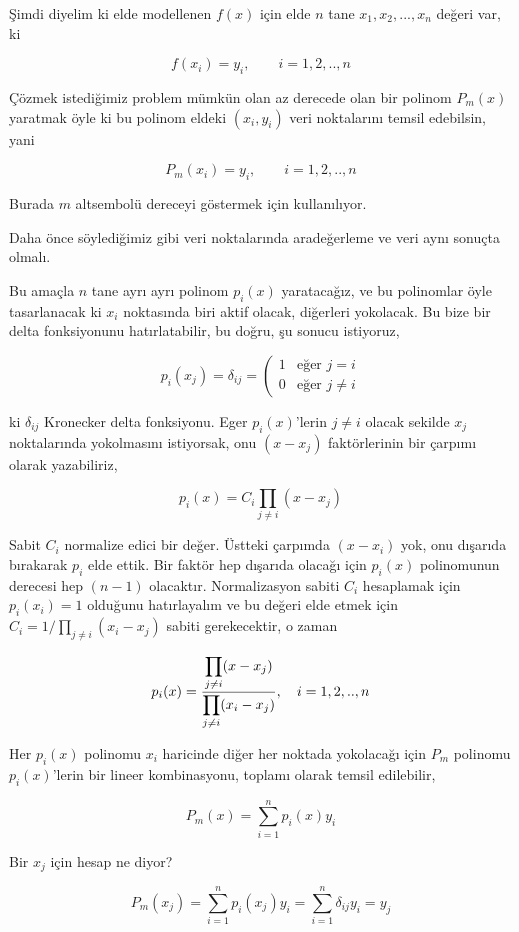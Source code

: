 \documentclass[12pt,fleqn]{article}\usepackage{../../common}
\begin{document}
Şimdi diyelim ki elde modellenen $f(x)$ için elde $n$ tane $x_1,x_2,...,x_n$
değeri var, ki

$$
f(x_i) = y_i, \qquad i=1,2,..,n
$$

Çözmek istediğimiz problem mümkün olan az derecede olan bir polinom $P_m(x)$
yaratmak öyle ki bu polinom eldeki $(x_i,y_i)$ veri noktalarını temsil
edebilsin, yani

$$
P_m(x_i) = y_i, \qquad i=1,2,..,n
$$

Burada $m$ altsembolü dereceyi göstermek için kullanılıyor.

Daha önce söylediğimiz gibi veri noktalarında aradeğerleme ve veri aynı sonuçta
olmalı.

Bu amaçla $n$ tane ayrı ayrı polinom $p_i(x)$ yaratacağız, ve bu polinomlar öyle
tasarlanacak ki $x_i$ noktasında biri aktif olacak, diğerleri yokolacak.  Bu
bize bir delta fonksiyonunu hatırlatabilir, bu doğru, şu sonucu istiyoruz,

$$
p_i(x_j) = \delta_{ij} = \left(
\begin{array}{ll}
1 & \textrm{eğer } j = i  \\
0 & \textrm{eğer } j \ne i 
\end{array} \right.
$$


ki $\delta_{ij}$ Kronecker delta fonksiyonu. Eger $p_i(x)$'lerin $j \ne i$
olacak sekilde $x_j$ noktalarında yokolmasını istiyorsak, onu $(x-x_j)$
faktörlerinin bir çarpımı olarak yazabiliriz,

$$
p_i(x) = C_i \prod_{j \ne i} (x-x_j)
$$

Sabit $C_i$ normalize edici bir değer. Üstteki çarpımda $(x-x_i)$ yok,
onu dışarıda bırakarak $p_i$ elde ettik. Bir faktör hep dışarıda olacağı
için $p_i(x)$ polinomunun derecesi hep $(n-1)$ olacaktır. Normalizasyon
sabiti $C_i$ hesaplamak için $p_i(x_i)=1$ olduğunu hatırlayalım ve
bu değeri elde etmek için $C_i = 1 / \prod_{j \ne i} (x_i - x_j)$
sabiti gerekecektir, o zaman

$$
p_i(x) = \frac
{\displaystyle \prod_{j \ne i} (x - x_j)}
{\displaystyle \prod_{j \ne i} (x_i - x_j)},
\quad i=1,2,..,n
$$

Her $p_i(x)$ polinomu $x_i$ haricinde diğer her noktada yokolacağı için $P_m$
polinomu $p_i(x)$'lerin bir lineer kombinasyonu, toplamı olarak temsil
edilebilir,

$$
P_m(x) =  \sum_{i=1}^{n} p_i (x) y_i
$$

Bir $x_j$ için hesap ne diyor?

$$
P_m(x_j) = \sum_{i=1}^{n} p_i(x_j) y_i =  \sum_{i=1}^{n} \delta_{ij} y_i = y_j
$$
\end{document}
